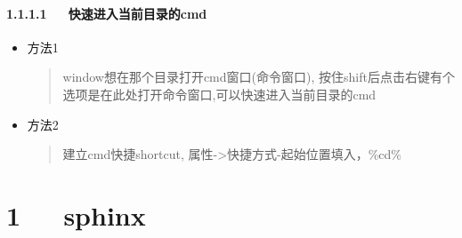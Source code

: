\documentclass[letterpaper,12pt,english]{sphinxmanual}
\begin{document}
\subsubsection{1.1.1.1   快速进入当前目录的cmd}
\label{\detokenize{001software/001install/shell:cmd}}\begin{itemize}
\item {} 
方法1
\begin{quote}

window想在那个目录打开cmd窗口(命令窗口), 按住shift后点击右键有个选项是在此处打开命令窗口,可以快速进入当前目录的cmd
\end{quote}

\item {} 
方法2
\begin{quote}

建立cmd快捷shortcut, 属性-\textgreater{}快捷方式-起始位置填入，\%cd\%
\end{quote}

\end{itemize}


\chapter{1   sphinx}
\label{\detokenize{001software/001install/sphinx:sphinx}}\label{\detokenize{001software/001install/sphinx::doc}}
\end{document}
